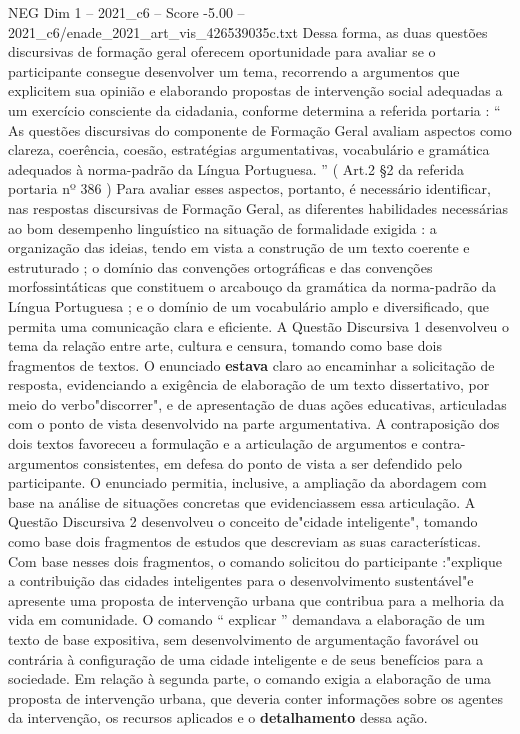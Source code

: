 \begin{textsample}{NEG Dim 1 – 2021\_c6 – Score -5.00 – 2021\_c6/enade\_2021\_art\_vis\_426539035c.txt}
Dessa forma, as duas questões discursivas de formação geral oferecem oportunidade para avaliar se o participante consegue desenvolver um tema, recorrendo a argumentos que explicitem sua opinião e elaborando propostas de intervenção social adequadas a um exercício consciente da cidadania, conforme determina a referida portaria : “ As questões discursivas do componente de Formação Geral avaliam aspectos como clareza, coerência, coesão, estratégias argumentativas, vocabulário e gramática adequados à norma-padrão da Língua Portuguesa. ” ( Art.2 §2 da referida portaria nº 386 ) Para avaliar esses aspectos, portanto, é necessário identificar, nas respostas discursivas de Formação Geral, as diferentes habilidades necessárias ao bom desempenho linguístico na situação de formalidade exigida : a organização das ideias, tendo em vista a construção de um texto coerente e estruturado ; o domínio das convenções ortográficas e das convenções morfossintáticas que constituem o arcabouço da gramática da norma-padrão da Língua Portuguesa ; e o domínio de um vocabulário amplo e diversificado, que permita uma comunicação clara e eficiente.
A Questão Discursiva 1 desenvolveu o tema da relação entre arte, cultura e censura, tomando como base dois fragmentos de textos.
O enunciado \textbf{estava} claro ao encaminhar a solicitação de resposta, evidenciando a exigência de elaboração de um texto dissertativo, por meio do verbo"discorrer", e de apresentação de duas ações educativas, articuladas com o ponto de vista desenvolvido na parte argumentativa.
A contraposição dos dois textos favoreceu a formulação e a articulação de argumentos e contra-argumentos consistentes, em defesa do ponto de vista a ser defendido pelo participante.
O enunciado permitia, inclusive, a ampliação da abordagem com base na análise de situações concretas que evidenciassem essa articulação.
A Questão Discursiva 2 desenvolveu o conceito de"cidade inteligente", tomando como base dois fragmentos de estudos que descreviam as suas características.
Com base nesses dois fragmentos, o comando solicitou do participante :"explique a contribuição das cidades inteligentes para o desenvolvimento sustentável"e apresente uma proposta de intervenção urbana que contribua para a melhoria da vida em comunidade.
O comando “ explicar ” demandava a elaboração de um texto de base expositiva, sem desenvolvimento de argumentação favorável ou contrária à configuração de uma cidade inteligente e de seus benefícios para a sociedade.
Em relação à segunda parte, o comando exigia a elaboração de uma proposta de intervenção urbana, que deveria conter informações sobre os agentes da intervenção, os recursos aplicados e o \textbf{detalhamento} dessa ação.

\end{textsample}
